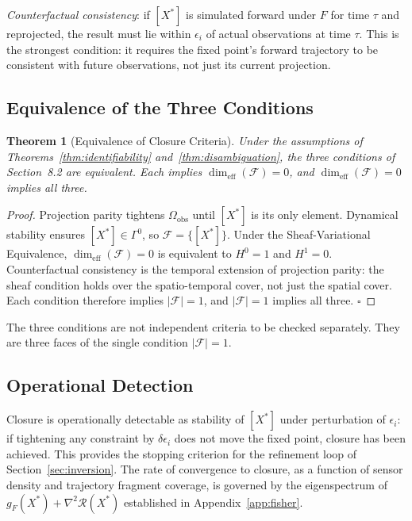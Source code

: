 \documentclass[12pt, oneside]{article}
\newtheorem{theorem}{Theorem}[section]
\begin{document}
\emph{Counterfactual consistency}: if $[X^*]$ is simulated forward under $F$ for time
$\tau$ and reprojected, the result must lie within $\epsilon_i$ of actual observations
at time $\tau$. This is the strongest condition: it requires the fixed point's forward
trajectory to be consistent with future observations, not just its current projection.

\subsection{Equivalence of the Three Conditions}

\begin{theorem}[Equivalence of Closure Criteria]
\label{thm:closure_equiv}
Under the assumptions of Theorems~\ref{thm:identifiability} and~\ref{thm:disambiguation},
the three conditions of Section~8.2 are equivalent. Each implies
$\dim_{\mathrm{eff}}(\mathcal{F}) = 0$, and $\dim_{\mathrm{eff}}(\mathcal{F}) = 0$
implies all three.
\end{theorem}

\begin{proof}
Projection parity tightens $\Omega_{\mathrm{obs}}$ until $[X^*]$ is its only element.
Dynamical stability ensures $[X^*] \in \Gamma^0$, so $\mathcal{F} = \{[X^*]\}$. Under
the Sheaf-Variational Equivalence, $\dim_{\mathrm{eff}}(\mathcal{F}) = 0$ is equivalent
to $H^0 = 1$ and $H^1 = 0$. Counterfactual consistency is the temporal extension of
projection parity: the sheaf condition holds over the spatio-temporal cover, not just the
spatial cover. Each condition therefore implies $|\mathcal{F}| = 1$, and $|\mathcal{F}|
= 1$ implies all three. $\square$
\end{proof}

The three conditions are not independent criteria to be checked separately. They are
three faces of the single condition $|\mathcal{F}| = 1$.

\subsection{Operational Detection}

Closure is operationally detectable as stability of $[X^*]$ under perturbation of
$\epsilon_i$: if tightening any constraint by $\delta\epsilon_i$ does not move the fixed
point, closure has been achieved. This provides the stopping criterion for the refinement
loop of Section~\ref{sec:inversion}. The rate of convergence to closure, as a function of
sensor density and trajectory fragment coverage, is governed by the eigenspectrum of
$g_F(X^*) + \nabla^2\mathcal{R}(X^*)$ established in Appendix~\ref{app:fisher}.
\end{document}
